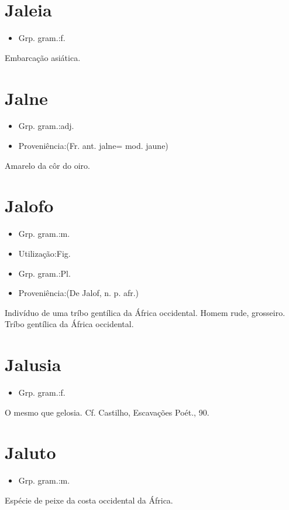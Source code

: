 \documentclass{article}
\begin{document}
\section{Jaleia}
\begin{itemize}
\item {Grp. gram.:f.}
\end{itemize}
Embarcação asiática.
\section{Jalne}
\begin{itemize}
\item {Grp. gram.:adj.}
\end{itemize}
\begin{itemize}
\item {Proveniência:(Fr. ant. \textunderscore jalne\textunderscore  = mod. \textunderscore jaune\textunderscore )}
\end{itemize}
Amarelo da côr do oiro.
\section{Jalofo}
\begin{itemize}
\item {Grp. gram.:m.}
\end{itemize}
\begin{itemize}
\item {Utilização:Fig.}
\end{itemize}
\begin{itemize}
\item {Grp. gram.:Pl.}
\end{itemize}
\begin{itemize}
\item {Proveniência:(De \textunderscore Jalof\textunderscore , n. p. afr.)}
\end{itemize}
Indivíduo de uma tríbo gentílica da África occidental.
Homem rude, grosseiro.
Tríbo gentílica da África occidental.
\section{Jalusia}
\begin{itemize}
\item {Grp. gram.:f.}
\end{itemize}
O mesmo que \textunderscore gelosia\textunderscore . Cf. Castilho, \textunderscore Escavações Poét.\textunderscore , 90.
\section{Jaluto}
\begin{itemize}
\item {Grp. gram.:m.}
\end{itemize}
Espécie de peixe da costa occidental da África.
\end{document}
